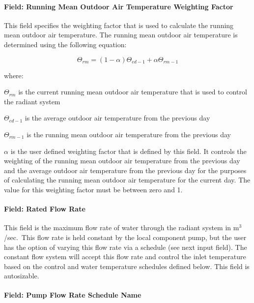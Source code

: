 \paragraph{Field: Running Mean Outdoor Air Temperature Weighting Factor}\label{field-running-mean-outdoor-air-temperature-weighting-factor}

This field specifies the weighting factor that is used to calculate the running mean outdoor air temperature.  The running mean outdoor air temperature is determined using the following equation:

\begin{equation}
\Theta_{rm} = (1 - \alpha) \Theta_{ed-1} + \alpha \Theta_{rm-1}
\label{eq:RunningMeanOutdoorAirTemperatureEquation}
\end{equation}

where: 

\(\Theta_{rm}\) is the current running mean outdoor air temperature that is used to control the radiant system

\(\Theta_{ed-1}\) is the average outdoor air temperature from the previous day

\(\Theta_{rm-1}\) is the running mean outdoor air temperature from the previous day

\(\alpha\) is the user defined weighting factor that is defined by this field.  It controls the weighting of the running mean outdoor air temperature from the previous day and the average outdoor air temperature from the previous day for the purposes of calculating the running mean outdoor air temperature for the current day.  The value for this weighting factor must be between zero and 1.

\paragraph{Field: Rated Flow Rate}\label{field-rated-flow-rate}

This field is the maximum flow rate of water through the radiant system in m\(^{3}\)/sec.~This flow rate is held constant by the local component pump, but the user has the option of varying this flow rate via a schedule (see next input field). The constant flow system will accept this flow rate and control the inlet temperature based on the control and water temperature schedules defined below. This field is autosizable.

\paragraph{Field: Pump Flow Rate Schedule Name}\label{field-pump-flow-rate-schedule-name-001}

